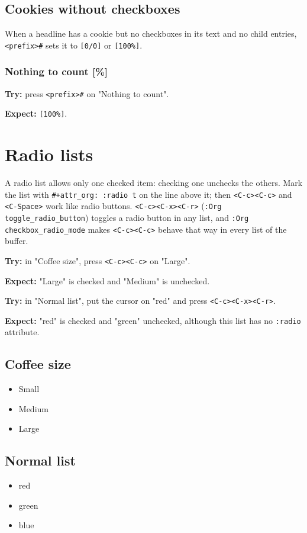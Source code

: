 \subsection{Cookies without checkboxes}
\label{sec:orge6bfee2}
When a headline has a cookie but no checkboxes in its text and no child
entries, \texttt{<prefix>\#} sets it to \texttt{[0/0]} or \texttt{[100\%]}.
\subsubsection{Nothing to count [\%]}
\label{sec:orgb08c2e4}
\textbf{Try:} press \texttt{<prefix>\#} on "Nothing to count".

\textbf{Expect:} \texttt{[100\%]}.
\section{Radio lists}
\label{sec:orgb72b707}
A radio list allows only one checked item: checking one unchecks the
others. Mark the list with \texttt{\#+attr\_org: :radio t} on the line above it;
then \texttt{<C-c><C-c>} and \texttt{<C-Space>} work like radio buttons.
\texttt{<C-c><C-x><C-r>} (\texttt{:Org toggle\_radio\_button}) toggles a radio button in
any list, and \texttt{:Org checkbox\_radio\_mode} makes \texttt{<C-c><C-c>} behave that
way in every list of the buffer.

\textbf{Try:} in "Coffee size", press \texttt{<C-c><C-c>} on "Large".

\textbf{Expect:} "Large" is checked and "Medium" is unchecked.

\textbf{Try:} in "Normal list", put the cursor on "red" and press
\texttt{<C-c><C-x><C-r>}.

\textbf{Expect:} "red" is checked and "green" unchecked, although this list has no
\texttt{:radio} attribute.
\subsection{Coffee size}
\label{sec:org0c92d11}
\begin{itemize}
\item[{$\square$}] Small
\item[{$\boxtimes$}] Medium
\item[{$\square$}] Large
\end{itemize}
\subsection{Normal list}
\label{sec:orgd57504c}
\begin{itemize}
\item[{$\square$}] red
\item[{$\boxtimes$}] green
\item[{$\square$}] blue
\end{itemize}
